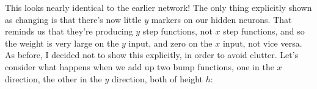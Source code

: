 \documentclass[a4paper,twoside,10pt]{book}
\begin{document}
\begin{center}
\end{center}
%
%
This looks nearly identical to the earlier network! The only thing explicitly shown as changing is that there's now little $y$ markers on our hidden neurons. That reminds us that they're producing $y$ step functions, not $x$ step functions, and so the weight is very large on the $y$ input, and zero on the $x$ input, not vice versa. As before, I decided not to show this explicitly, in order to avoid clutter.
%
Let's consider what happens when we add up two bump functions, one in the $x$ direction, the other in the $y$ direction, both of height $h$:
\end{document}
